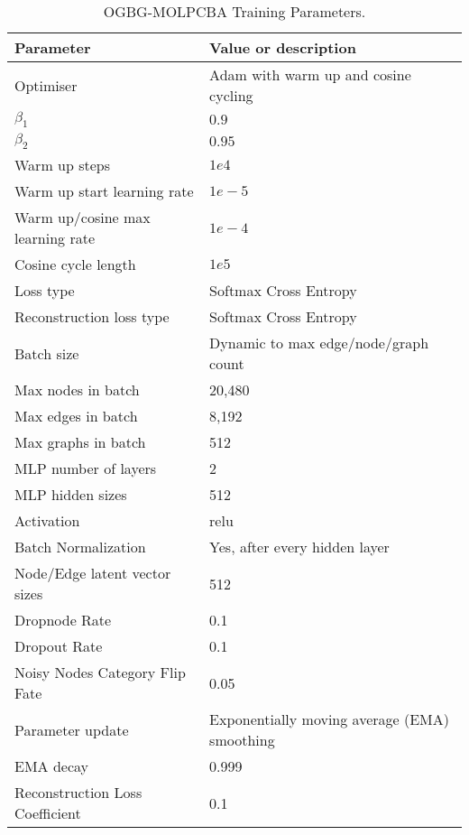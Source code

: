\documentclass{article} \usepackage{iclr2022_conference,times}
\begin{document}
\begin{table}[]
\caption{OGBG-MOLPCBA Training Parameters.}
    \label{molpcba-params}
    \centering
    \begin{tabular}{ll}
      \toprule
       Parameter & Value or description \\
       \midrule
       Optimiser & Adam with warm up and cosine cycling \\
       $\beta_1$   & $0.9$ \\              
       $\beta_2$   & $0.95$ \\                     
       Warm up steps    & $1e4$ \\
       Warm up start learning rate    & $1e-5$ \\       
       Warm up/cosine max learning rate    & $1e-4$ \\       
       Cosine cycle length    & $1e5$ \\       
       Loss type & Softmax Cross Entropy \\
       Reconstruction loss type & Softmax Cross Entropy \\
     \midrule
       Batch size & Dynamic to max edge/node/graph count \\
       Max nodes in batch & 20,480 \\
       Max edges in batch & 8,192 \\   
       Max graphs in batch & 512 \\    
     \midrule
       MLP number of layers & 2 \\
       MLP hidden sizes & 512 \\
       Activation & relu \\
       Batch Normalization & Yes, after every hidden layer \\
       Node/Edge latent vector sizes & 512 \\ 
     \midrule
       Dropnode Rate & 0.1 \\
       Dropout Rate & 0.1 \\
       Noisy Nodes Category Flip Fate & 0.05 \\
       Parameter update & Exponentially moving average (EMA) smoothing \\
       EMA decay & 0.999 \\
       Reconstruction Loss Coefficient & 0.1 \\
    \bottomrule

\end{tabular}
\end{table}
\end{document}
